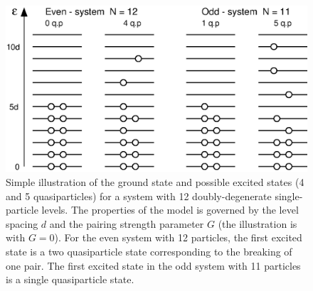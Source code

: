 \begin{figure}
\includegraphics[totalheight=16cm,angle=0,bb=0 20 350 730]{fig2.ps}
\caption{Simple illustration of the ground state and possible excited states 
(4 and 5 quasiparticles) for a system with 12 doubly-degenerate single-particle levels. The properties of the model is governed by the level spacing $d$ and the pairing strength parameter $G$ (the illustration is with $G=0$). For the even system with 12 particles, the first excited state is a two quasiparticle state corresponding to the breaking of one pair. The first excited state in the odd system with 11 particles is a single quasiparticle state.} 
\label{fig:fig2}
\end{figure}

